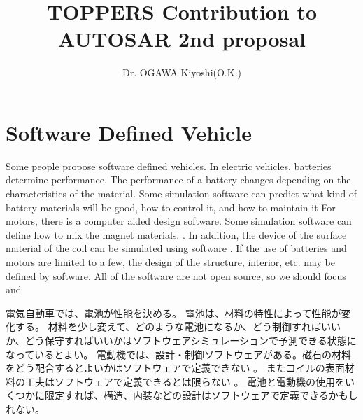 \documentclass[twocolumn]{article} %
\title{TOPPERS Contribution to AUTOSAR 2nd proposal}
\author{Dr. OGAWA Kiyoshi(O.K.)}
\begin{document}
\maketitle

\section{Software Defined Vehicle}
Some people propose  software defined vehicles.
In electric vehicles, batteries determine performance.
The performance of a battery changes depending on the characteristics of the material.
Some simulation software can predict what kind of battery materials will be good,  how to control it, and how to maintain it
For motors, there is a computer aided design software. Some simulation software can define how to mix the magnet materials. \cite{motormag}. 
In addition, the device of the surface material of the coil can  be simulated using software \cite{motorcoi}.
If the use of batteries and motors are limited to a few, the design of the structure, interior, etc. may be defined by software.
All of the software are not open source, so we should focus and 

電気自動車では、電池が性能を決める。
電池は、材料の特性によって性能が変化する。
材料を少し変えて、どのような電池になるか、どう制御すればいいか、どう保守すればいいかはソフトウェアシミュレーションで予測できる状態になっているとよい。
電動機では、設計・制御ソフトウェアがある。磁石の材料をどう配合するとよいかはソフトウェアで定義できない\cite{motormag} 。
またコイルの表面材料の工夫はソフトウェアで定義できるとは限らない\cite{motorcoi} 。
電池と電動機の使用をいくつかに限定すれば、構造、内装などの設計はソフトウェアで定義できるかもしれない。
\end{document}
